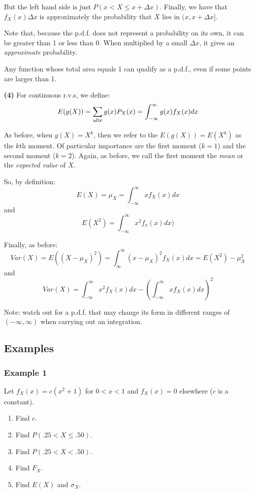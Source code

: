 \documentclass[12pt]{article}
\begin{document}
But the left hand side is just $P(x < X \leq x + \Delta x)$. Finally, we have that $f_X (x) \Delta x$ is approximately the probability that $X$ lies in $(x, x + \Delta x]$. %

Note that, because the p.d.f. does not represent a probability on its own, it can be greater than 1 or less than 0. When multiplied by a small $\Delta x$, it gives an \emph{approximate} probability.

Any function whose total area equals 1 can qualify as a p.d.f., even if some points are larger than 1.

\textbf{(4)} For continuous r.v.s, we define:
\[
    E(g(X)) = \sum_{\textnormal{all} x} g(x) P_X (x) = \int_{-\infty}^{\infty} g(x) f_X (x) dx
\]

As before, when $g(X) = X^k$, then we refer to the $E(g(X)) = E(X^k)$ as the $k$th moment. Of particular importance are the first moment ($k=1$) and the second moment ($k=2$). Again, as before, we call the first moment the \emph{mean} or the \emph{expected value} of $X$.

So, by definition:
\[
    E(X) = \mu_X = \int_{-\infty}^{\infty} x f_X (x) dx
\]
and
\[
    E(X^2) = \int_{-\infty}^{\infty} x^2 f_x (x) dx)
\]

Finally, as before:
\[
    Var(X) = E((X - \mu_X)^2) = \int_{\infty}^{\infty} (x - \mu_X)^2 f_X (x) dx = E(X^2) - \mu_X^2
\]
and
\[
    Var(X) = \int_{-\infty}^{\infty} x^2 f_X (x) dx - (\int_{-\infty}^{\infty} x f_X (x) dx)^2
\]

Note: watch out for a p.d.f. that may change its form in different ranges of $(-\infty,\infty)$ when carrying out an integration.

\subsection{Examples}
\subsubsection{Example 1}
Let $f_X (x) = c(x^2 + 1)$ for $0 < x < 1$ and $f_X (x) = 0$ elsewhere ($c$ is a constant).
\begin{enumerate}
    \item Find $c$.
    \item Find $P(.25 < X \leq .50)$.
    \item Find $P(.25 < X < .50)$.
    \item Find $F_X$.
    \item Find $E(X)$ and $\sigma_X$.
\end{enumerate}
\end{document}
